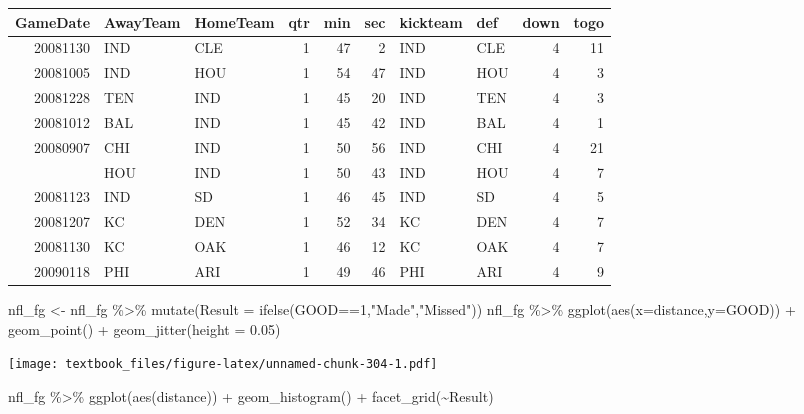 \documentclass[
  11pt,
]{book}
\newenvironment{Shaded}{\begin{snugshade}}{\end{snugshade}}
\newcommand{\AttributeTok}[1]{\textcolor[rgb]{0.77,0.63,0.00}{#1}}
\newcommand{\DecValTok}[1]{\textcolor[rgb]{0.00,0.00,0.81}{#1}}
\newcommand{\FloatTok}[1]{\textcolor[rgb]{0.00,0.00,0.81}{#1}}
\newcommand{\FunctionTok}[1]{\textcolor[rgb]{0.00,0.00,0.00}{#1}}
\newcommand{\NormalTok}[1]{#1}
\newcommand{\OtherTok}[1]{\textcolor[rgb]{0.56,0.35,0.01}{#1}}
\newcommand{\SpecialCharTok}[1]{\textcolor[rgb]{0.00,0.00,0.00}{#1}}
\newcommand{\StringTok}[1]{\textcolor[rgb]{0.31,0.60,0.02}{#1}}
\theoremstyle{definition}
\theoremstyle{definition}
\theoremstyle{definition}
\theoremstyle{definition}
\theoremstyle{remark}
\begin{document}
\begin{tabular}{rllrrrllrr}
\toprule
GameDate & AwayTeam & HomeTeam & qtr & min & sec & kickteam & def & down & togo\\
\midrule
20081130 & IND & CLE & 1 & 47 & 2 & IND & CLE & 4 & 11\\
20081005 & IND & HOU & 1 & 54 & 47 & IND & HOU & 4 & 3\\
20081228 & TEN & IND & 1 & 45 & 20 & IND & TEN & 4 & 3\\
20081012 & BAL & IND & 1 & 45 & 42 & IND & BAL & 4 & 1\\
20080907 & CHI & IND & 1 & 50 & 56 & IND & CHI & 4 & 21\\
\addlinespace
20081116 & HOU & IND & 1 & 50 & 43 & IND & HOU & 4 & 7\\
20081123 & IND & SD & 1 & 46 & 45 & IND & SD & 4 & 5\\
20081207 & KC & DEN & 1 & 52 & 34 & KC & DEN & 4 & 7\\
20081130 & KC & OAK & 1 & 46 & 12 & KC & OAK & 4 & 7\\
20090118 & PHI & ARI & 1 & 49 & 46 & PHI & ARI & 4 & 9\\
\bottomrule
\end{tabular}

\newpage

\begin{Shaded}
\begin{Highlighting}[]
\NormalTok{nfl\_fg }\OtherTok{\textless{}{-}}\NormalTok{ nfl\_fg }\SpecialCharTok{\%\textgreater{}\%} \FunctionTok{mutate}\NormalTok{(}\AttributeTok{Result =} \FunctionTok{ifelse}\NormalTok{(GOOD}\SpecialCharTok{==}\DecValTok{1}\NormalTok{,}\StringTok{"Made"}\NormalTok{,}\StringTok{"Missed"}\NormalTok{))}
\NormalTok{nfl\_fg }\SpecialCharTok{\%\textgreater{}\%} \FunctionTok{ggplot}\NormalTok{(}\FunctionTok{aes}\NormalTok{(}\AttributeTok{x=}\NormalTok{distance,}\AttributeTok{y=}\NormalTok{GOOD)) }\SpecialCharTok{+} \FunctionTok{geom\_point}\NormalTok{() }\SpecialCharTok{+} \FunctionTok{geom\_jitter}\NormalTok{(}\AttributeTok{height =} \FloatTok{0.05}\NormalTok{)}
\end{Highlighting}
\end{Shaded}

\texttt{[image: textbook\_files/figure-latex/unnamed-chunk-304-1.pdf]}

\newpage

\begin{Shaded}
\begin{Highlighting}[]
\NormalTok{nfl\_fg }\SpecialCharTok{\%\textgreater{}\%} \FunctionTok{ggplot}\NormalTok{(}\FunctionTok{aes}\NormalTok{(distance)) }\SpecialCharTok{+} \FunctionTok{geom\_histogram}\NormalTok{() }\SpecialCharTok{+} \FunctionTok{facet\_grid}\NormalTok{(}\SpecialCharTok{\textasciitilde{}}\NormalTok{Result)}
\end{Highlighting}
\end{Shaded}
\end{document}
